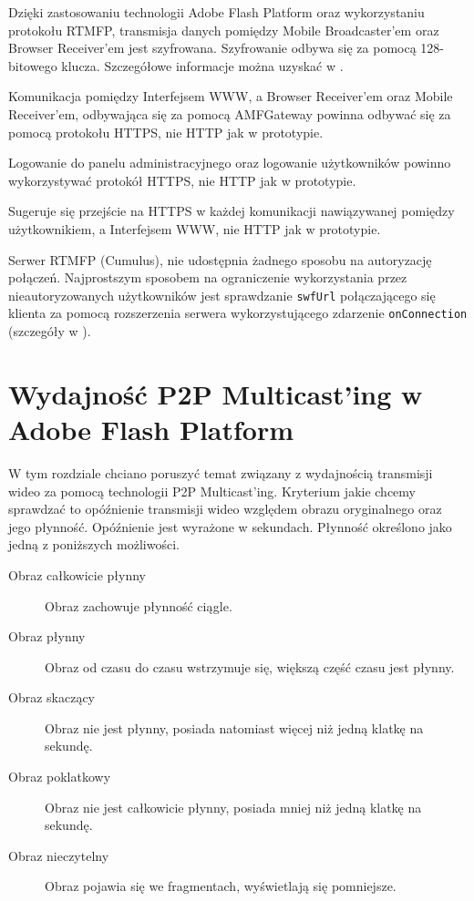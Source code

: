 \begin{packed_item}
    \item{Dzięki zastosowaniu technologii Adobe Flash Platform oraz wykorzystaniu protokołu RTMFP, transmisja danych pomiędzy Mobile Broadcaster'em oraz Browser Receiver'em jest szyfrowana. Szyfrowanie odbywa się za pomocą 128-bitowego klucza. Szczegółowe informacje można uzyskać w \cite{AdobeSecurity}}.
    \item{Komunikacja pomiędzy Interfejsem WWW, a Browser Receiver'em oraz Mobile Receiver'em, odbywająca się za pomocą AMFGateway powinna odbywać się za pomocą protokołu HTTPS, nie HTTP jak w prototypie.}
    \item{Logowanie do panelu administracyjnego oraz logowanie użytkowników powinno wykorzystywać protokół HTTPS, nie HTTP jak w prototypie.}
    \item{Sugeruje się przejście na HTTPS w każdej komunikacji nawiązywanej pomiędzy użytkownikiem, a Interfejsem WWW, nie HTTP jak w prototypie.}
    \item{Serwer RTMFP (Cumulus), nie udostępnia żadnego sposobu na autoryzację połączeń. Najprostszym sposobem na ograniczenie wykorzystania przez nieautoryzowanych użytkowników jest sprawdzanie \texttt{swfUrl} połączającego się klienta za pomocą rozszerzenia serwera wykorzystującego zdarzenie \texttt{onConnection} (szczegóły w \cite{CumulusDocs}).}
\end{packed_item}

\newpage
\section{Wydajność P2P Multicast'ing w Adobe Flash Platform}

W tym rozdziale chciano poruszyć temat związany z wydajnością transmisji wideo za pomocą technologii P2P Multicast'ing. Kryterium jakie chcemy sprawdzać to opóźnienie transmisji wideo względem obrazu oryginalnego oraz jego płynność. Opóźnienie jest wyrażone w sekundach. Płynność określono jako jedną z poniższych możliwości.
\begin{description}
    \item[Obraz całkowicie płynny] Obraz zachowuje płynność ciągle.
    \item[Obraz płynny] Obraz od czasu do czasu wstrzymuje się, większą część czasu jest płynny.
    \item[Obraz skaczący] Obraz nie jest płynny, posiada natomiast więcej niż jedną klatkę na sekundę.
    \item[Obraz poklatkowy] Obraz nie jest całkowicie płynny, posiada mniej niż jedną klatkę na sekundę.
    \item[Obraz nieczytelny] Obraz pojawia się we fragmentach, wyświetlają się pomniejsze.
\end{description}

